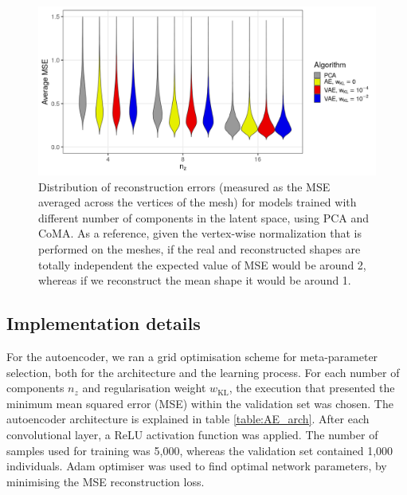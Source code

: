 \begin{figure}[ht!]
\includegraphics[width=\linewidth]{figs/performance.png}
\caption{Distribution of reconstruction errors (measured as the MSE averaged across the vertices of the mesh) for models trained with different number of components in the latent space, using PCA and CoMA. As a reference, given the vertex-wise normalization that is performed on the meshes, if the real and reconstructed shapes are totally independent the expected value of MSE would be around 2, whereas if we reconstruct the mean shape it would be around 1.}
\label{fig:pca_vs_coma}
\end{figure}

\subsection*{Implementation details}
For the autoencoder, we ran a grid optimisation scheme for meta-parameter selection, both for the architecture and the learning process. For each number of components $n_z$ and regularisation weight $w_\textrm{KL}$, the execution that presented the minimum mean squared error (MSE) within the validation set was chosen.
The autoencoder architecture is explained in table \ref{table:AE_arch}. After each convolutional layer, a ReLU activation function was applied. The number of samples used for training was 5,000, whereas the validation set contained 1,000 individuals. Adam optimiser was used to find optimal network parameters, by minimising the MSE reconstruction loss.


